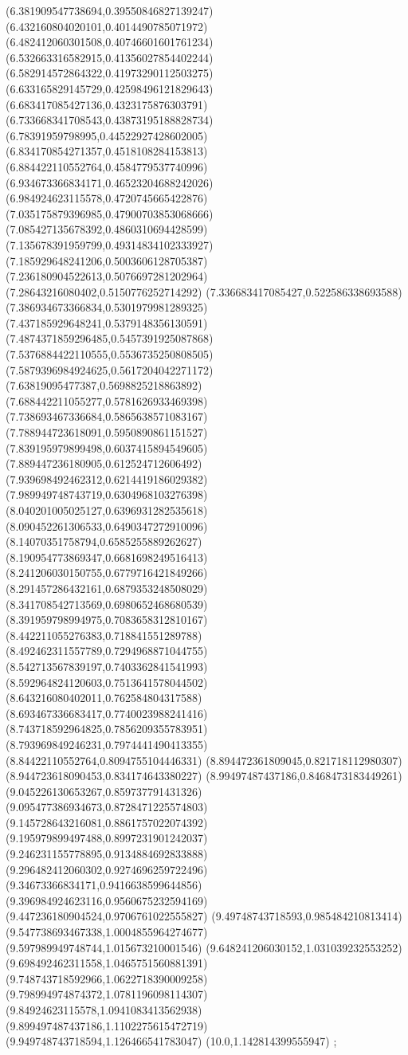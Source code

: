 {(6.381909547738694,0.39550846827139247)
(6.432160804020101,0.4014490785071972)
(6.482412060301508,0.40746601601761234)
(6.532663316582915,0.41356027854402244)
(6.582914572864322,0.41973290112503275)
(6.633165829145729,0.42598496121829643)
(6.683417085427136,0.4323175876303791)
(6.733668341708543,0.43873195188828734)
(6.78391959798995,0.44522927428602005)
(6.834170854271357,0.4518108284153813)
(6.884422110552764,0.4584779537740996)
(6.934673366834171,0.46523204688242026)
(6.984924623115578,0.4720745665422876)
(7.035175879396985,0.47900703853068666)
(7.085427135678392,0.4860310694428599)
(7.135678391959799,0.49314834102333927)
(7.185929648241206,0.5003606128705387)
(7.236180904522613,0.5076697281202964)
(7.28643216080402,0.5150776252714292)
(7.336683417085427,0.522586338693588)
(7.386934673366834,0.5301979981289325)
(7.437185929648241,0.5379148356130591)
(7.4874371859296485,0.5457391925087868)
(7.5376884422110555,0.5536735250808505)
(7.5879396984924625,0.5617204042271172)
(7.63819095477387,0.5698825218863892)
(7.688442211055277,0.5781626933469398)
(7.738693467336684,0.5865638571083167)
(7.788944723618091,0.5950890861151527)
(7.839195979899498,0.6037415894549605)
(7.889447236180905,0.612524712606492)
(7.939698492462312,0.6214419186029382)
(7.989949748743719,0.6304968103276398)
(8.040201005025127,0.6396931282535618)
(8.090452261306533,0.6490347272910096)
(8.14070351758794,0.6585255889262627)
(8.190954773869347,0.6681698249516413)
(8.241206030150755,0.6779716421849266)
(8.291457286432161,0.6879353248508029)
(8.341708542713569,0.6980652468680539)
(8.391959798994975,0.7083658312810167)
(8.442211055276383,0.718841551289788)
(8.492462311557789,0.7294968871044755)
(8.542713567839197,0.7403362841541993)
(8.592964824120603,0.7513641578044502)
(8.643216080402011,0.762584804317588)
(8.693467336683417,0.7740023988241416)
(8.743718592964825,0.7856209355783951)
(8.793969849246231,0.7974441490413355)
(8.84422110552764,0.8094755104446331)
(8.894472361809045,0.821718112980307)
(8.944723618090453,0.834174643380227)
(8.99497487437186,0.8468473183449261)
(9.045226130653267,0.859737791431326)
(9.095477386934673,0.8728471225574803)
(9.145728643216081,0.8861757022074392)
(9.195979899497488,0.8997231901242037)
(9.246231155778895,0.9134884692833888)
(9.296482412060302,0.9274696259722496)
(9.34673366834171,0.9416638599644856)
(9.396984924623116,0.9560675232594169)
(9.447236180904524,0.9706761022555827)
(9.49748743718593,0.985484210813414)
(9.547738693467338,1.0004855964274677)
(9.597989949748744,1.015673210001546)
(9.648241206030152,1.031039232553252)
(9.698492462311558,1.0465751560881391)
(9.748743718592966,1.0622718390009258)
(9.798994974874372,1.0781196098114307)
(9.84924623115578,1.0941083413562938)
(9.899497487437186,1.1102275615472719)
(9.949748743718594,1.126466541783047)
(10.0,1.142814399555947)
};
